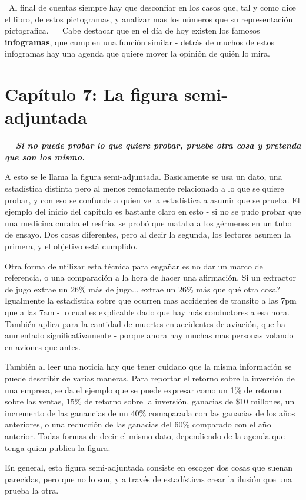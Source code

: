 \documentclass[letterpaper, 11pt]{article}
\begin{document}
 Al final de cuentas siempre hay que desconfiar en los casos que, tal y como dice el libro, de estos pictogramas, y analizar mas los números que su representación pictografica.
 
 Cabe destacar que en el día de hoy existen los famosos \textbf{infogramas}, que cumplen una función similar - detrás de muchos de estos infogramas hay una agenda que quiere mover la opinión de quién lo mira. 
 
 \section*{Capítulo 7: La figura semi-adjuntada}
 
 \textbf{\textit{Si no puede probar lo que quiere probar, pruebe otra cosa y pretenda que son los mismo.}}

A esto se le llama la figura semi-adjuntada. Basicamente se usa un dato, una estadística distinta pero al menos remotamente relacionada a lo que se quiere probar, y con eso se confunde a quien ve la estadística a asumir que se prueba. El ejemplo del inicio del capítulo es bastante claro en esto - si no se pudo probar que una medicina curaba el resfrío, se probó que mataba a los gérmenes en un tubo de ensayo. Dos cosas diferentes, pero al decir la segunda, los lectores asumen la primera, y el objetivo está cumplido.

Otra forma de utilizar esta técnica para engañar es no dar un marco de referencia, o una comparación a la hora de hacer una afirmación. Si un extractor de jugo extrae un 26\% más de jugo... extrae un 26\% más que qué otra cosa? Igualmente la estadística sobre que ocurren mas accidentes de transito a las 7pm que a las 7am - lo cual es explicable dado que hay más conductores a esa hora. También aplica para la cantidad de muertes en accidentes de aviación, que ha aumentado significativamente - porque ahora hay muchas mas personas volando en aviones que antes.

También al leer una noticia hay que tener cuidado que la misma información se puede describir de varias maneras. Para reportar el retorno sobre la inversión de una empresa, se da el ejemplo que se puede expresar como un 1\% de retorno sobre las ventas, 15\% de retorno sobre la inversión, ganacias de \$10 millones, un incremento de las ganancias de un 40\% comaparada con las ganacias de los años anteriores, o una reducción de las ganacias del 60\% comparado con el año anterior. Todas formas de decir el mismo dato, dependiendo de la agenda que tenga quien publica la figura.

En general, esta figura semi-adjuntada consiste en escoger dos cosas que suenan parecidas, pero que no lo son, y a través de estadísticas crear la ilusión que una prueba la otra.
\end{document}
